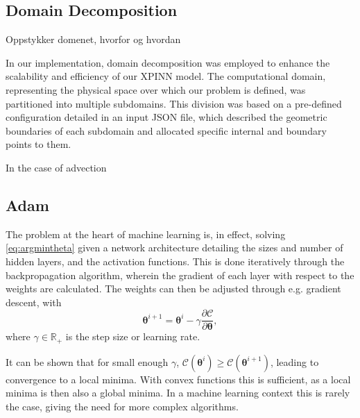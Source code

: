 \subsection{Domain Decomposition}
Oppstykker domenet, hvorfor og hvordan

In our implementation, domain decomposition was employed to enhance the scalability and efficiency of our XPINN model. The computational domain, representing the physical space over which our problem is defined, was partitioned into multiple subdomains. This division was based on a pre-defined configuration detailed in an input JSON file, which described the geometric boundaries of each subdomain and allocated specific internal and boundary points to them.

In the case of advection

\subsection{Adam}
The problem at the heart of machine learning is, in effect, solving \autoref{eq:argmintheta} given a network architecture detailing the sizes and number of hidden layers, and the activation functions. This is done iteratively through the backpropagation algorithm, wherein the gradient of each layer with respect to the weights are calculated. The weights can then be adjusted through e.g. gradient descent, with
\begin{equation}
    \boldsymbol{\theta}^{i+1} = \boldsymbol{\theta}^i - \gamma \frac{\partial \mathcal{C}}{\partial \boldsymbol{\theta}},
\end{equation}
where $\gamma \in \mathbb{R}_{+}$ is the step size or learning rate.

It can be shown that for small enough $\gamma$, $\mathcal{C}(\boldsymbol{\theta}^i) \geq \mathcal{C}(\boldsymbol{\theta}^{i+1})$, leading to convergence to a local minima. With convex functions this is sufficient, as a local minima is then also a global minima. In a machine learning context this is rarely the case, giving the need for more complex algorithms.

